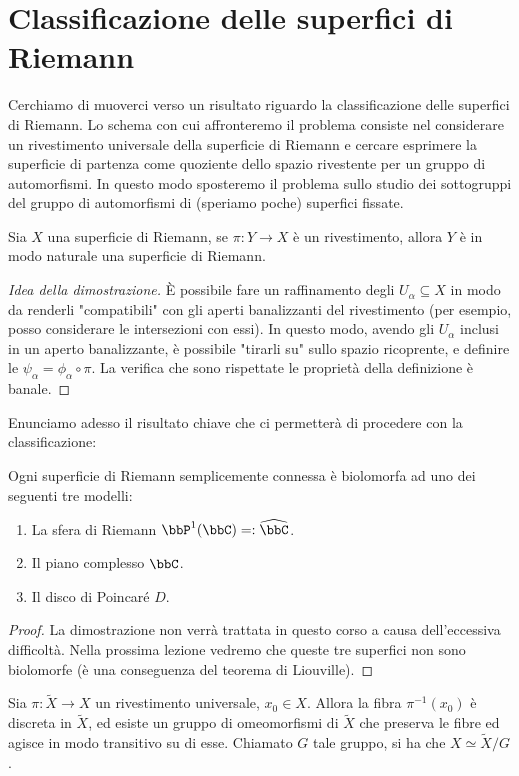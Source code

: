 \section{Classificazione delle superfici di Riemann}
Cerchiamo di muoverci verso un risultato riguardo la classificazione delle superfici di Riemann. Lo schema con cui affronteremo il problema consiste nel considerare un rivestimento universale della superficie di Riemann e cercare esprimere la superficie di partenza come quoziente dello spazio rivestente per un gruppo di automorfismi. In questo modo sposteremo il problema sullo studio dei sottogruppi del gruppo di automorfismi di (speriamo poche) superfici fissate.
\begin{osservazione}
Sia $X$ una superficie di Riemann, se $\pi:Y\rightarrow X$ è un rivestimento, allora $Y$ è in modo naturale una superficie di Riemann.
\end{osservazione} 
\begin{proof}[Idea della dimostrazione]
È possibile fare un raffinamento degli $U_\alpha\subseteq X$ in modo da renderli "compatibili" con gli aperti banalizzanti del rivestimento (per esempio, posso considerare le intersezioni con essi). In questo modo, avendo gli $U_\alpha$ inclusi in un aperto banalizzante, è possibile "tirarli su" sullo spazio ricoprente, e definire le $\psi_\alpha=\phi_\alpha \circ \pi$. La verifica che sono rispettate le proprietà della definizione è banale.
\end{proof}
Enunciamo adesso il risultato chiave che ci permetterà di procedere con la classificazione:
\begin{teorema}[di Riemann]
Ogni superficie di Riemann semplicemente connessa è biolomorfa ad uno dei seguenti tre modelli:
\begin{enumerate}
  \item La sfera di Riemann $\bbP^1(\bbC)=:\widehat{\bbC}$.
  \item Il piano complesso $\bbC$.
  \item Il disco di Poincaré $D$.
\end{enumerate}
\end{teorema} 
\begin{proof}
La dimostrazione non verrà trattata in questo corso a causa dell'eccessiva difficoltà.
Nella prossima lezione vedremo che queste tre superfici non sono biolomorfe (è una conseguenza del teorema di Liouville).
\end{proof}
\begin{osservazione}
Sia $\pi:\widetilde{X}\rightarrow X$ un rivestimento universale, $x_0\in X$. Allora la fibra $\pi^{-1}(x_0)$ è discreta in $\widetilde{X}$, ed esiste un gruppo di omeomorfismi di $\widetilde{X}$ che preserva le fibre ed agisce in modo transitivo su di esse. Chiamato $G$ tale gruppo, si ha che $X \simeq \widetilde{X}/G$.
\end{osservazione}
